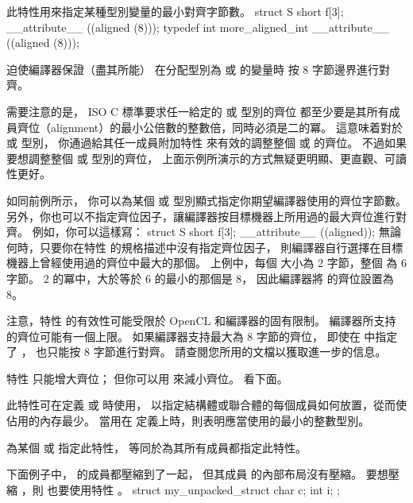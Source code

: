 此特性用來指定某種型別變量的最小對齊字節數。
\startclc
struct S { short f[3]; } __attribute__ ((aligned (8)));
typedef int more_aligned_int __attribute__ ((aligned (8)));
\stopclc

迫使編譯器保證（盡其所能）
在分配型別為  或  的變量時
{}按 8 字節邊界進行對齊。

需要注意的是， ISO C 標準要求任一給定的  或  型別的齊位
都至少要是其所有成員齊位（alignment）的最小公倍數的整數倍，同時必須是二的冪。
這意味着對於  或  型別，
你{}通過給其任一成員附加特性 
 來有效的調整整個  或  的齊位。
不過如果要想調整整個  或  型別的齊位，
上面示例所演示的方式無疑更明顯、更直觀、可讀性更好。

如同前例所示，
你可以為某個  或  型別顯式指定你期望編譯器使用的齊位字節數。
另外，你也可以不指定齊位因子，讓編譯器按目標機器上所用過的最大齊位進行對齊。
例如，你可以這樣寫：
\startclc
struct S { short f[3]; } __attribute__ ((aligned));
\stopclc
無論何時，只要你在特性  的規格描述中沒有指定齊位因子，
則編譯器自行選擇在目標機器上曾經使用過的齊位中最大的那個。
上例中，每個  大小為 2 字節，整個  為 6 字節。
 2 的冪中，大於等於 6 的最小的那個是 8，
因此編譯器將  的齊位設置為 8。

注意，特性  的有效性可能受限於 OpenCL 和編譯器的固有限制。
編譯器所支持的齊位可能有一個上限。
如果編譯器支持最大為 8 字節的齊位，
即使在  中指定了 ，
也只能按 8 字節進行對齊。
請查閱您所用的文檔以獲取進一步的信息。

特性  只能增大齊位；
但你可以用  來減小齊位。
看下面。
\stopclOption

此特性可在定義  或  時使用，
以指定結構體或聯合體的每個成員如何放置，從而使佔用的內存最少。
當用在  定義上時，則表明應當使用的最小的整數型別。

為某個  或  指定此特性，
等同於為其所有成員都指定此特性。

下面例子中，  的成員都壓縮到了一起，
但其成員  的內部布局沒有壓縮。
要想壓縮 ，則  也要使用特性 。
\startclc
struct my_unpacked_struct
{
	char c;
	int i;
};

